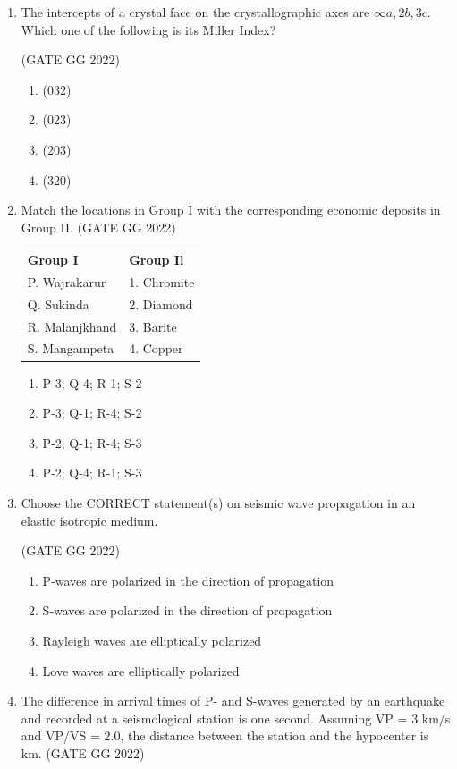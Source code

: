 \documentclass[journal]{IEEEtran}
\begin{document}
\begin{enumerate}[start=1]
\item The intercepts of a crystal face on the crystallographic axes are $\infty a, 2b, 3c$.  
Which one of the following is its Miller Index?

\hfill(GATE GG 2022)
\begin{enumerate}
\item (032)
\item (023)
\item (203)
\item (320)
\end{enumerate}

\item Match the locations in Group I with the corresponding economic deposits in Group II.
\hfill(GATE GG 2022)
\begin{tabular}{ l l }
\textbf{Group I} & \textbf{Group Il}\\
P. Wajrakarur & 1. Chromite \\
 Q. Sukinda & 2. Diamond\\
 R. Malanjkhand &  3. Barite\\
 S. Mangampeta & 4. Copper
\end{tabular}
\begin{enumerate}
\item P-3; Q-4; R-1; S-2
\item P-3; Q-1; R-4; S-2
\item P-2; Q-1; R-4; S-3
\item P-2; Q-4; R-1; S-3
\end{enumerate}

\item Choose the CORRECT statement(s) on seismic wave propagation in an elastic isotropic medium.

\hfill(GATE GG 2022)
\begin{enumerate}
\item P-waves are polarized in the direction of propagation
\item S-waves are polarized in the direction of propagation
\item Rayleigh waves are elliptically polarized
\item Love waves are elliptically polarized
\end{enumerate}

\item The difference in arrival times of P- and S-waves generated by an earthquake and recorded at a seismological station is one second. Assuming VP = $3$ km/s and VP/VS = $2.0$, the distance between the station and the hypocenter is \makebox[2cm]{\hrulefill} km. 
\hfill(GATE GG 2022)
\vspace{0.5cm}


\end{enumerate}
\end{document}
